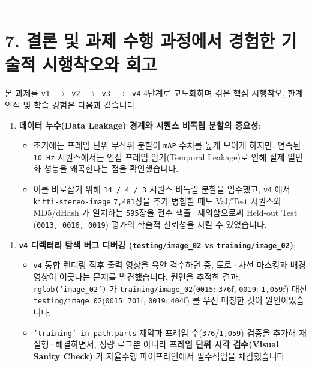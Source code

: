 \documentclass[10.5pt,a4paper]{article}
\begin{document}
\par\noindent\rule{\textwidth}{0.4pt}\par\medskip

\section{7. 결론 및 과제 수행 과정에서 경험한 기술적 시행착오와 회고}

본 과제를 \texttt{v1 $\rightarrow$ v2 $\rightarrow$ v3 $\rightarrow$ v4} 4단계로 고도화하며 겪은 핵심 시행착오, 한계 인식 및 학습 경험은 다음과 같습니다.


\begin{enumerate}[leftmargin=1.8em,itemsep=2pt]
\item \textbf{데이터 누수(Data Leakage) 경계와 시퀀스 비독립 분할의 중요성}:
\begin{itemize}[leftmargin=1.5em,itemsep=2pt]
\item 초기에는 프레임 단위 무작위 분할이 \texttt{mAP} 수치를 높게 보이게 하지만, 연속된 \texttt{10 Hz} 시퀀스에서는 인접 프레임 암기(Temporal Leakage)로 인해 실제 일반화 성능을 왜곡한다는 점을 확인했습니다.
\item 이를 바로잡기 위해 \texttt{14 /\allowbreak{} 4 /\allowbreak{} 3} 시퀀스 비독립 분할을 엄수했고, \texttt{v4} 에서 \texttt{kitti-\allowbreak{}stereo-\allowbreak{}image} \texttt{7,\allowbreak{}481}장을 추가 병합할 때도 Val/Test 시퀀스와 MD5/dHash 가 일치하는 \texttt{595}장을 전수 색출·제외함으로써 Held-out Test (\texttt{0013,\allowbreak{} 0016,\allowbreak{} 0019}) 평가의 학술적 신뢰성을 지킬 수 있었습니다.
\end{itemize}
\end{enumerate}

\begin{enumerate}[leftmargin=1.8em,itemsep=2pt]
\item \textbf{\texttt{v4} 디렉터리 탐색 버그 디버깅 (\texttt{testing/\allowbreak{}image\_\allowbreak{}02} vs \texttt{training/\allowbreak{}image\_\allowbreak{}02})}:
\begin{itemize}[leftmargin=1.5em,itemsep=2pt]
\item \texttt{v4} 통합 렌더링 직후 출력 영상을 육안 검수하던 중, 도로·차선 마스킹과 배경 영상이 어긋나는 문제를 발견했습니다. 원인을 추적한 결과, \texttt{rglob('image\_\allowbreak{}02')} 가 \texttt{training/\allowbreak{}image\_\allowbreak{}02}(\texttt{0015}: \texttt{376}f, \texttt{0019}: \texttt{1,\allowbreak{}059}f) 대신 \texttt{testing/\allowbreak{}image\_\allowbreak{}02}(\texttt{0015}: \texttt{701}f, \texttt{0019}: \texttt{404}f) 를 우선 매칭한 것이 원인이었습니다.
\item \texttt{'training' in path.\allowbreak{}parts} 제약과 프레임 수(\texttt{376}/\texttt{1,\allowbreak{}059}) 검증을 추가해 재실행·해결하면서, 정량 로그뿐 아니라 \textbf{프레임 단위 시각 검수(Visual Sanity Check)} 가 자율주행 파이프라인에서 필수적임을 체감했습니다.
\end{itemize}
\end{enumerate}
\end{document}
